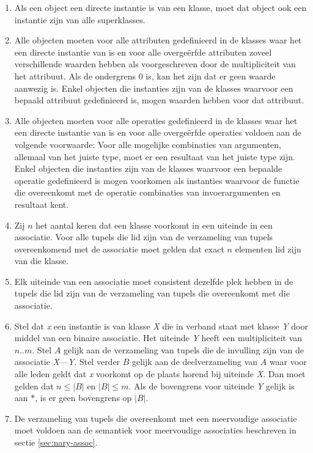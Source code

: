 \begin{enumerate}
	\item Als een object een directe instantie is van een klasse, moet dat object ook een instantie zijn van alle superklasses.\label{rule:instance}
	\item Alle objecten moeten voor alle attributen gedefinieerd in de klasses waar het een directe instantie van is en voor alle overge\"erfde attributen zoveel verschillende waarden hebben als voorgeschreven door de multipliciteit van het attribuut. Als de ondergrens 0 is, kan het zijn dat er geen waarde aanwezig is. Enkel objecten die instanties zijn van de klasses waarvoor een bepaald attribuut gedefinieerd is, mogen waarden hebben voor dat attribuut.\label{rule:attr}
	\item Alle objecten moeten voor alle operaties gedefinieerd in de klasses waar het een directe instantie van is en voor alle overge\"erfde operaties voldoen aan de volgende voorwaarde: Voor alle mogelijke combinaties van argumenten, allemaal van het juiste type, moet er een resultaat van het juiste type zijn. Enkel objecten die instanties zijn van de klasses waarvoor een bepaalde operatie gedefinieerd is mogen voorkomen als instanties waarvoor de functie die overeenkomt met de operatie combinaties van invoerargumenten en resultaat kent.\label{rule:op}
	\item Zij $n$ het aantal keren dat een klasse voorkomt in een uiteinde in een associatie. Voor alle tupels die lid zijn van de verzameling van tupels overeenkomend met de associatie moet gelden dat exact $n$ elementen lid zijn van die klasse.\label{rule:assoc-occ}
	\item Elk uiteinde van een associatie moet consistent dezelfde plek hebben in de tupels die lid zijn van de verzameling van tupels die overeenkomt met die associatie.\label{rule:assoc-con}
	\item Stel dat \textit{x} een instantie is van klasse \textit{X} die in verband staat met klasse \textit{Y} door middel van een binaire associatie. Het uiteinde \textit{Y} heeft een multipliciteit van $n..m$. Stel $A$ gelijk aan de verzameling van tupels die de invulling zijn van de associatie \textit{X}---\textit{Y}. Stel verder $B$ gelijk aan de deelverzameling van $A$ waar voor alle leden geldt dat \textit{x} voorkomt op de plaats horend bij uiteinde \textit{X}. Dan moet gelden dat $n \leq |B|$ en $|B| \leq m$. Als de bovengrens voor uiteinde \textit{Y} gelijk is aan $*$, is er geen bovengrens op $|B|$.\label{rule:assoc-mult}
	\item De verzameling van tupels die overeenkomt met een meervoudige associatie moet voldoen aan de semantiek voor meervoudige associaties beschreven in sectie \ref{sec:nary-assoc}.\label{rule:assoc-nary}
\end{enumerate}


